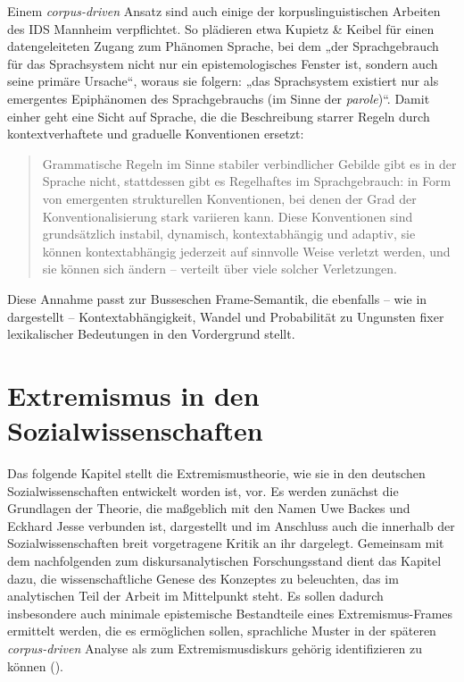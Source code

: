 Einem \emph{corpus-driven} Ansatz sind auch einige der korpuslinguistischen Arbeiten des IDS Mannheim verpflichtet. So plädieren etwa Kupietz \& Keibel \autocite*[39-40]{kupietzGebrauchsbasierteGrammatikStatistische2009} für einen datengeleiteten Zugang zum Phänomen Sprache, bei dem „der Sprachgebrauch für das Sprachsystem nicht nur ein epistemologisches Fenster ist, sondern auch seine primäre Ursache``, woraus sie folgern: „das Sprachsystem existiert nur als emergentes Epiphänomen des Sprachgebrauchs (im Sinne der \emph{parole})``. Damit einher geht eine Sicht auf Sprache, die die Beschreibung starrer Regeln durch kontextverhaftete und graduelle Konventionen ersetzt:

\begin{quote}
Grammatische Regeln im Sinne stabiler verbindlicher Gebilde gibt es in der Sprache nicht, stattdessen gibt es Regelhaftes im Sprachgebrauch: in Form von emergenten strukturellen Konventionen, bei denen der Grad der Konventionalisierung stark variieren kann. Diese Konventionen sind grundsätzlich instabil, dynamisch, kontextabhängig und adaptiv, sie können kontextabhängig jederzeit auf sinnvolle Weise verletzt werden, und sie können sich ändern -- verteilt über viele solcher Verletzungen. \autocite[41]{kupietzGebrauchsbasierteGrammatikStatistische2009}
\end{quote}

Diese Annahme passt zur Busseschen Frame-Semantik, die ebenfalls -- wie in  dargestellt -- Kontextabhängigkeit, Wandel und Probabilität zu Ungunsten fixer lexikalischer Bedeutungen in den Vordergrund stellt.

\section{Extremismus in den Sozialwissenschaften}\label{extremismus-in-den-sozialwissenschaften}

Das folgende Kapitel stellt die Extremismustheorie, wie sie in den deutschen Sozialwissenschaften entwickelt worden ist, vor. Es werden zunächst die Grundlagen der Theorie, die maßgeblich mit den Namen Uwe Backes und Eckhard Jesse verbunden ist, dargestellt und im Anschluss auch die innerhalb der Sozialwissenschaften breit vorgetragene Kritik an ihr dargelegt. Gemeinsam mit dem nachfolgenden  zum diskursanalytischen Forschungsstand dient das Kapitel dazu, die wissenschaftliche Genese des Konzeptes zu beleuchten, das im analytischen Teil der Arbeit im Mittelpunkt steht. Es sollen dadurch insbesondere auch minimale epistemische Bestandteile eines Extremismus-Frames ermittelt werden, die es ermöglichen sollen, sprachliche Muster in der späteren \emph{corpus-driven} Analyse als zum Extremismusdiskurs gehörig identifizieren zu können ().

